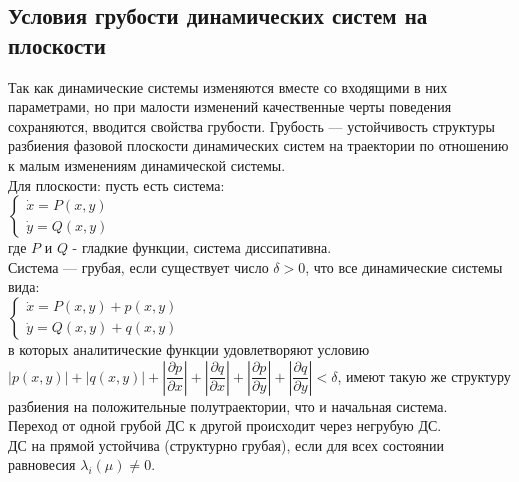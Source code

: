 \begin{multicols*}{2}
		\section{Условия грубости динамических систем на плоскости}
		Так как динамические системы изменяются вместе со входящими в них параметрами, но при малости изменений качественные черты поведения сохраняются, вводится свойства грубости. Грубость — устойчивость структуры разбиения фазовой плоскости динамических систем на траектории по отношению к малым изменениям динамической системы.\\
		Для плоскости: пусть есть система:\\
		$\begin{cases}
			\dot{x} = P(x,y) \\
			\dot{y} = Q(x,y)
		\end{cases} $\\
		где $P$ и $Q$ - гладкие функции, система диссипативна.\\
		Система — грубая, если существует число $\delta>0$, что все динамические системы вида:\\
		$\begin{cases}
			\dot{x} = P(x,y) + p(x,y) \\
			\dot{y} = Q(x,y) + q(x,y)
		\end{cases} $\\
		в которых аналитические функции удовлетворяют условию $\left\lvert p(x,y)\right\rvert  + \left\lvert q(x,y)\right\rvert + \left\lvert \dfrac{\partial p}{\partial x}\right\rvert + \left\lvert \dfrac{\partial q}{\partial x}\right\rvert + \left\lvert \dfrac{\partial p}{\partial y}\right\rvert + \left\lvert \dfrac{\partial q}{\partial y}\right\rvert < \delta $, имеют такую же структуру разбиения на положительные полутраектории, что и начальная система.\\
		Переход от одной грубой ДС к другой происходит через негрубую ДС.\\
		ДС на прямой устойчива (структурно грубая), если для всех состоянии равновесия $\lambda_i(\mu)\neq 0$.
		

\end{multicols*}
